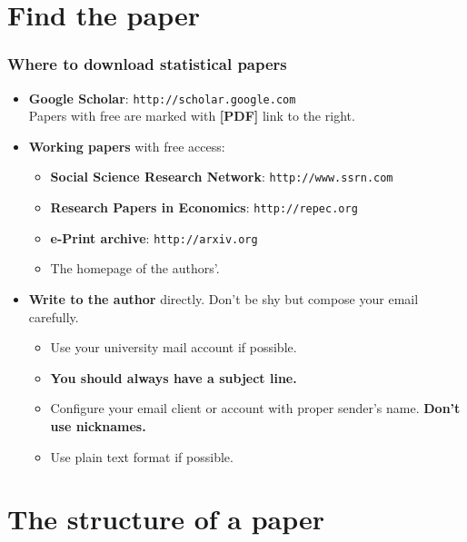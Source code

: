 \documentclass[10pt]{beamer}
\begin{document}
\section{Find the paper}
\begin{frame}
  \frametitle{Where to download statistical papers}

  \begin{itemize}
  \item \textbf{Google Scholar}: \texttt{http://scholar.google.com}\\
    Papers with free are marked with \textbf{[PDF]} link to the right.
  \item \textbf{Working papers} with free access:
    \begin{itemize}
    \item \textbf{Social Science Research Network}:
      \texttt{http://www.ssrn.com}
    \item \textbf{Research Papers in Economics}: \texttt{http://repec.org}
    \item \textbf{e-Print archive}: \texttt{http://arxiv.org}
    \item The homepage of the authors'.

    \end{itemize}

  \item \textbf{Write to the author} directly. Don't be shy but compose your
    email carefully.

  \begin{itemize}
  \item Use your university mail account if possible.
  \item \textbf{You should always have a subject line.}
  \item Configure your email client or account with proper sender's name. \textbf{Don't
    use nicknames.}
  \item Use plain text format if possible.
  \end{itemize}


  \end{itemize}

\end{frame}

\section{The structure of a paper}
\end{document}
